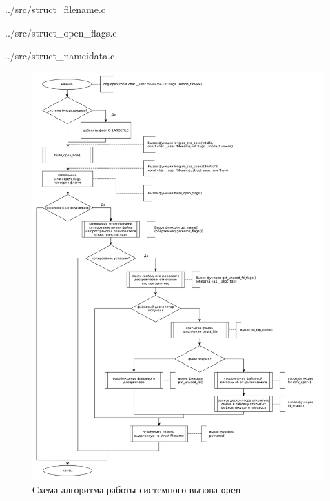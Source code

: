 \begin{lstinputlisting}[
	caption={Структура \texttt{struct filename}},
	style={c},
	]{../src/struct_filename.c}
\end{lstinputlisting}

\begin{lstinputlisting}[
	caption={Структура \texttt{struct open\_flags}},
	style={c},
	]{../src/struct_open_flags.c}
\end{lstinputlisting}

\begin{lstinputlisting}[
	caption={Структура \texttt{struct nameidata}},
	style={c},
	]{../src/struct_nameidata.c}
\end{lstinputlisting}

\clearpage

\begin{figure}[h!btp]
	\centering
	\includegraphics[width=490pt]{inc/open.pdf}
	\caption{Схема алгоритма работы системного вызова \texttt{open}}
\end{figure}

